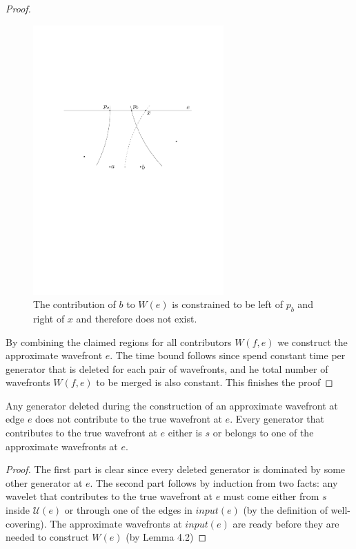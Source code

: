 \begin{proof}
    \begin{figure}[H]
	\centering
	\includegraphics[width=0.65\textwidth]{figures/contribution.pdf}
	\caption{The contribution of $b$ to $W(e)$ is constrained to be left of $p_b$ 
    		 and right of $x$ and therefore does not exist\cite{HershbergerS99}.}
	\label{fig:artificialwavefront}
	\end{figure}

	By combining the claimed regions for all contributors $W(f,e)$ we construct
	the approximate wavefront $e$. The time bound follows since spend constant
	time per generator that is deleted for each pair of wavefronts, and he total
	number of wavefronts $W(f,e)$ to be merged is also constant. This finishes
	the proof
\end{proof}
\begin{Lemma}
	Any generator deleted during the construction of an approximate wavefront at
	edge $e$ does not contribute to the true wavefront at $e$. Every generator
	that contributes to the true wavefront at $e$ either is $s$ or belongs to
	one of the approximate wavefronts at $e$.
\end{Lemma}
\begin{proof}
	The first part is clear since every deleted generator is dominated by some other
	generator at $e$. The second part follows by induction from two facts: any
	wavelet that contributes to the true wavefront at $e$ must come either from
	$s$ inside $\mathcal{U}(e)$ or through one of the edges in $input(e)$ (by
	the definition of well-covering). The approximate wavefronts at $input(e)$
	are ready before they are needed to construct $W(e)$ (by Lemma 4.2)
\end{proof}

